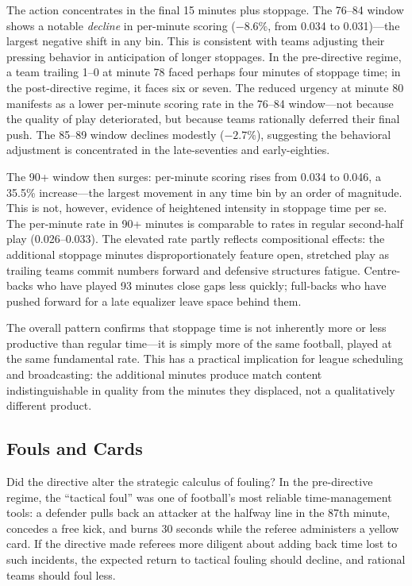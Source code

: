 The action concentrates in the final 15 minutes plus stoppage. The 76--84 window shows a notable \emph{decline} in per-minute scoring ($-8.6\%$, from 0.034 to 0.031)---the largest negative shift in any bin. This is consistent with teams adjusting their pressing behavior in anticipation of longer stoppages. In the pre-directive regime, a team trailing 1--0 at minute 78 faced perhaps four minutes of stoppage time; in the post-directive regime, it faces six or seven. The reduced urgency at minute 80 manifests as a lower per-minute scoring rate in the 76--84 window---not because the quality of play deteriorated, but because teams rationally deferred their final push. The 85--89 window declines modestly ($-2.7\%$), suggesting the behavioral adjustment is concentrated in the late-seventies and early-eighties.

The 90+ window then surges: per-minute scoring rises from 0.034 to 0.046, a 35.5\% increase---the largest movement in any time bin by an order of magnitude. This is not, however, evidence of heightened intensity in stoppage time per se. The per-minute rate in 90+ minutes is comparable to rates in regular second-half play (0.026--0.033). The elevated rate partly reflects compositional effects: the additional stoppage minutes disproportionately feature open, stretched play as trailing teams commit numbers forward and defensive structures fatigue. Centre-backs who have played 93 minutes close gaps less quickly; full-backs who have pushed forward for a late equalizer leave space behind them.

The overall pattern confirms that stoppage time is not inherently more or less productive than regular time---it is simply more of the same football, played at the same fundamental rate. This has a practical implication for league scheduling and broadcasting: the additional minutes produce match content indistinguishable in quality from the minutes they displaced, not a qualitatively different product.


\subsection{Fouls and Cards}
\label{subsec:fouls_cards}

Did the directive alter the strategic calculus of fouling? In the pre-directive
regime, the ``tactical foul'' was one of football's most reliable
time-management tools: a defender pulls back an attacker at the halfway line in
the 87th minute, concedes a free kick, and burns 30 seconds while the referee
administers a yellow card. If the directive made referees more diligent about
adding back time lost to such incidents, the expected return to tactical fouling
should decline, and rational teams should foul less.

